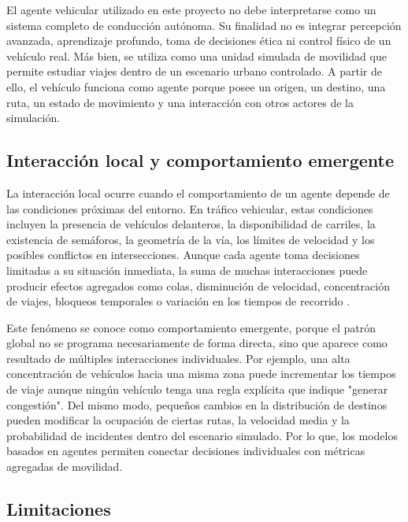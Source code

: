 El agente vehicular utilizado en este proyecto no debe interpretarse como un sistema completo de conducción autónoma. Su finalidad no es integrar percepción avanzada, aprendizaje profundo, toma de decisiones ética ni control físico de un vehículo real. Más bien, se utiliza como una unidad simulada de movilidad que permite estudiar viajes dentro de un escenario urbano controlado. A partir de ello, el vehículo funciona como agente porque posee un origen, un destino, una ruta, un estado de movimiento y una interacción con otros actores de la simulación.

\subsection{Interacción local y comportamiento emergente}
\label{subsubsec:interaccion_local_comportamiento_emergente}

La interacción local ocurre cuando el comportamiento de un agente depende de las condiciones próximas del entorno. En tráfico vehicular, estas condiciones incluyen la presencia de vehículos delanteros, la disponibilidad de carriles, la existencia de semáforos, la geometría de la vía, los límites de velocidad y los posibles conflictos en intersecciones. Aunque cada agente toma decisiones limitadas a su situación inmediata, la suma de muchas interacciones puede producir efectos agregados como colas, disminución de velocidad, concentración de viajes, bloqueos temporales o variación en los tiempos de recorrido \cite{bonabeau2002abm,macal2010abms}.

Este fenómeno se conoce como comportamiento emergente, porque el patrón global no se programa necesariamente de forma directa, sino que aparece como resultado de múltiples interacciones individuales. Por ejemplo, una alta concentración de vehículos hacia una misma zona puede incrementar los tiempos de viaje aunque ningún vehículo tenga una regla explícita que indique "generar congestión". Del mismo modo, pequeños cambios en la distribución de destinos pueden modificar la ocupación de ciertas rutas, la velocidad media y la probabilidad de incidentes dentro del escenario simulado. Por lo que, los modelos basados en agentes permiten conectar decisiones individuales con métricas agregadas de movilidad.

\subsection{Limitaciones}
\label{subsubsec:limitaciones_modelos_basados_agentes}

